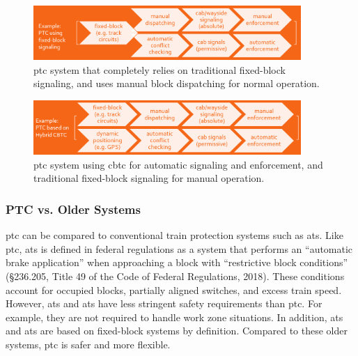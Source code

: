 \documentclass[11pt, titlepage]{article}
\begin{document}
\begin{figure}[ht]
    \begin{center}
        \includegraphics[width=4in]{FixedBlockPTC.png}
        \captionsetup{justification=centering}
        \caption[PTC with fixed-block signaling]{\gls{ptc} system that completely
        relies on traditional fixed-block signaling, and uses manual block dispatching
        for normal operation.}
    \end{center}
\end{figure}

\begin{figure}[ht]
    \begin{center}
        \includegraphics[width=4in]{PTCHybridCBTC.png}
        \captionsetup{justification=centering}
        \caption[PTC with hybrid CBTC]{\gls{ptc} system using \gls{cbtc} for automatic
        signaling and enforcement, and traditional fixed-block signaling for manual
        operation.}
        \label{PTCHybridCBTC}
    \end{center}
\end{figure}

\subsubsection{PTC vs. Older Systems}

\gls{ptc} can be compared to conventional train protection systems such as
\gls{ats}. Like \gls{ptc}, \gls{ats} is defined in federal regulations
as a system that performs an ``automatic brake application'' when approaching a
block with ``restrictive block conditions'' (§236.205, Title 49 of the Code of
Federal Regulations, 2018). These conditions account for occupied blocks, partially
aligned switches, and excess train speed. However, \gls{ats} and \gls{ats} have
less stringent safety requirements than \gls{ptc}. For example, they are not
required to handle work zone situations. In addition, \gls{ats} and \gls{ats} are
based on fixed-block systems by definition. Compared to these older systems,
\gls{ptc} is safer and more flexible.
\end{document}
